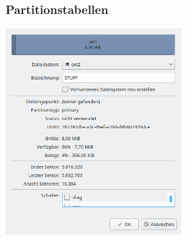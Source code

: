 \begin{frame}
    \frametitle{Partitionstabellen}
        \begin{center}
            \includegraphics[trim=0 3.43cm 0 0,clip,width=0.5\textwidth]{content/graphics/kparted-details.png}
        \end{center}
\end{frame}

